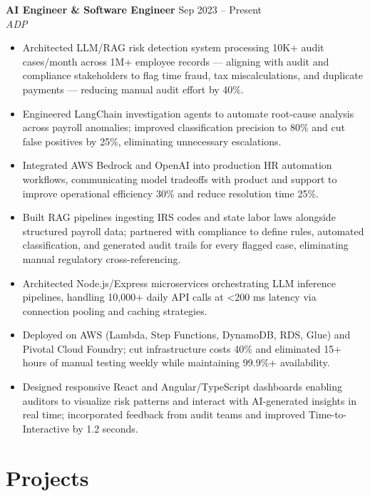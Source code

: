 \documentclass[10pt,letterpaper]{article}
\newcommand{\entry}[3]{%
  \vspace{3pt}\textbf{#1} \hfill #3 \\
  \textit{\small #2}\vspace{1pt}}
\begin{document}
\entry{AI Engineer \& Software Engineer}{ADP}{Sep 2023 -- Present}
\begin{itemize}
  \item Architected LLM/RAG risk detection system processing 10K+ audit cases/month across 1M+ employee records --- aligning with audit and compliance stakeholders to flag time fraud, tax miscalculations, and duplicate payments --- reducing manual audit effort by 40\%.
  \item Engineered LangChain investigation agents to automate root-cause analysis across payroll anomalies; improved classification precision to 80\% and cut false positives by 25\%, eliminating unnecessary escalations.
  \item Integrated AWS Bedrock and OpenAI into production HR automation workflows, communicating model tradeoffs with product and support to improve operational efficiency 30\% and reduce resolution time 25\%.
  \item Built RAG pipelines ingesting IRS codes and state labor laws alongside structured payroll data; partnered with compliance to define rules, automated classification, and generated audit trails for every flagged case, eliminating manual regulatory cross-referencing.
  \item Architected Node.js/Express microservices orchestrating LLM inference pipelines, handling 10,000+ daily API calls at \textless{}200 ms latency via connection pooling and caching strategies.
  \item Deployed on AWS (Lambda, Step Functions, DynamoDB, RDS, Glue) and Pivotal Cloud Foundry; cut infrastructure costs 40\% and eliminated 15+ hours of manual testing weekly while maintaining 99.9\%+ availability.
  \item Designed responsive React and Angular/TypeScript dashboards enabling auditors to visualize risk patterns and interact with AI-generated insights in real time; incorporated feedback from audit teams and improved Time-to-Interactive by 1.2 seconds.
\end{itemize}

\section{Projects}
\end{document}
